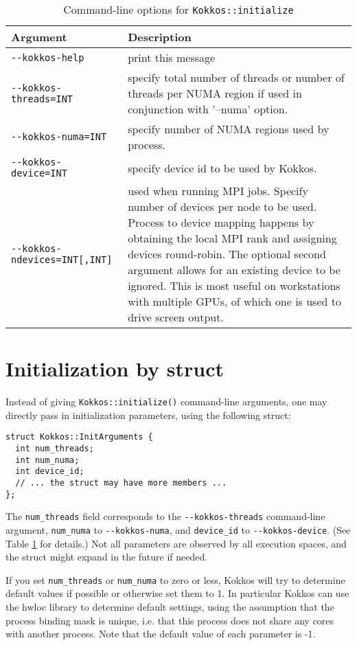 \begin{table}
\caption{Command-line options for \lstinline|Kokkos::initialize|}
\label{TBL:CommandLineOptions}
\begin{small}
\begin{tabular}[t]{lp{}}
\hline
Argument & Description \\\hline
\lstinline|--kokkos-help| & print this message \\
\lstinline|--kokkos-threads=INT| & 
specify total number of threads or number of threads per NUMA region if used in conjunction with '--numa' option. \\
\lstinline|--kokkos-numa=INT| & specify number of NUMA regions used by process. \\
\lstinline|--kokkos-device=INT| & specify device id to be used by Kokkos. \\
\lstinline|--kokkos-ndevices=INT[,INT]| & used when running MPI jobs. Specify number of
devices per node to be used. Process to device
mapping happens by obtaining the local MPI rank
and assigning devices round-robin. The optional
second argument allows for an existing device
to be ignored. This is most useful on workstations
with multiple GPUs, of which one is used to drive
screen output.\\
\hline
\end{tabular}
\end{small}
\end{table}

\section{Initialization by struct}\label{S:init:struct}

Instead of giving \lstinline|Kokkos::initialize()| command-line arguments,
one may directly pass in initialization parameters, using the following struct:
\begin{lstlisting}
struct Kokkos::InitArguments {
  int num_threads;
  int num_numa;
  int device_id;
  // ... the struct may have more members ...
};
\end{lstlisting}
The \lstinline|num_threads| field corresponds to the \verb!--kokkos-threads! command-line argument,
\lstinline|num_numa| to \verb!--kokkos-numa!, and \lstinline|device_id| to \verb!--kokkos-device!.
(See Table \ref{TBL:CommandLineOptions} for details.)
Not all parameters are observed by all execution spaces, and the struct might expand in the future if needed.

If you set \lstinline|num_threads| or \lstinline|num_numa| to zero or less, 
Kokkos will try to determine default values if possible or otherwise set them to 1.
In particular Kokkos can use the hwloc library to determine default settings, using the assumption that the process binding mask is unique, i.e. that this process does not share any cores with another process.
Note that the default value of each parameter is -1.

